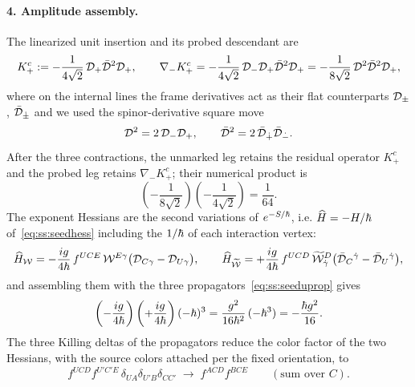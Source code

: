 \paragraph{4. Amplitude assembly.}
The linearized unit insertion and its probed descendant are
\begin{equation}\label{eq:ss:seedinsert}
K_{+}^{c}:=-\frac{1}{4\sqrt2}\,\mathcal{D}_{+}\bar{\mathcal{D}}^{2}\mathcal{D}_{+},
\qquad
\nabla_{-}K_{+}^{c}
=-\frac{1}{4\sqrt2}\,\mathcal{D}_{-}\mathcal{D}_{+}\bar{\mathcal{D}}^{2}\mathcal{D}_{+}
=-\frac{1}{8\sqrt2}\,\mathcal{D}^{2}\bar{\mathcal{D}}^{2}\mathcal{D}_{+},
\end{equation}
where on the internal lines the frame derivatives act as their flat
counterparts $\mathcal{D}_\pm$, $\bar{\mathcal{D}}_{\dot\pm}$ and we used the spinor-derivative
square move
\begin{equation}\label{eq:ss:seedDmoves}
\mathcal{D}^{2}=2\,\mathcal{D}_{-}\mathcal{D}_{+},
\qquad
\bar{\mathcal{D}}^{2}=2\,\bar{\mathcal{D}}_{\dot+}\bar{\mathcal{D}}_{\dot-}.
\end{equation}
After the three contractions, the unmarked leg retains the residual operator
$K_{+}^{c}$ and the probed leg retains $\nabla_{-}K_{+}^{c}$; their numerical
product is
\begin{equation}\label{eq:ss:seedinsertfactor}
\left(-\frac{1}{8\sqrt2}\right)\left(-\frac{1}{4\sqrt2}\right)=\frac{1}{64}.
\end{equation}
The exponent Hessians are the second variations of $e^{-S/\hbar}$, i.e.
$\widehat H=-H/\hbar$ of~\eqref{eq:ss:seedhess} including the $1/\hbar$ of each
interaction vertex:
\begin{equation}\label{eq:ss:seedvhess}
\widehat H_{\mathcal{W}}=-\frac{ig}{4\hbar}\,f^{UCE}\,\mathcal{W}^{E\gamma}
\big(\mathcal{D}_{C\gamma}-\mathcal{D}_{U\gamma}\big),
\qquad
\widehat H_{\widetilde{\mathcal{W}}}=+\frac{ig}{4\hbar}\,f^{UCD}\,\widetilde{\mathcal{W}}^{D}_{\dot\gamma}
\big(\bar{\mathcal{D}}_{C}{}^{\dot\gamma}-\bar{\mathcal{D}}_{U}{}^{\dot\gamma}\big),
\end{equation}
and assembling them with the three propagators~\eqref{eq:ss:seeduprop} gives
\begin{equation}\label{eq:ss:seedassembly}
\left(-\frac{ig}{4\hbar}\right)\left(+\frac{ig}{4\hbar}\right)(-\hbar)^{3}
=\frac{g^{2}}{16\hbar^{2}}\,(-\hbar^{3})
=-\frac{\hbar g^{2}}{16}.
\end{equation}
The three Killing deltas of the propagators reduce the color factor of the
two Hessians, with the source colors attached per the fixed orientation, to
\begin{equation}\label{eq:ss:seedcolor}
f^{UCD}f^{U'C'E}\,\delta_{UA}\delta_{U'B}\delta_{CC'}
\;\longrightarrow\;
f^{ACD}f^{BCE}
\qquad(\text{sum over }C).
\end{equation}

